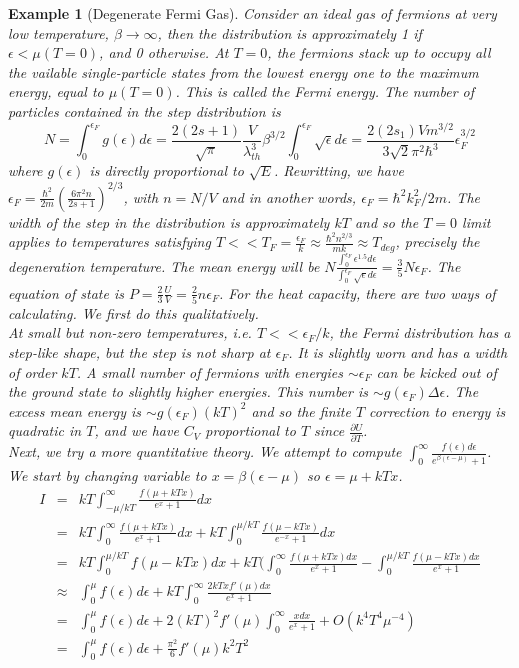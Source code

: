 \documentclass[a4paper]{article}
\newtheorem{eg}{Example}[section]
\theoremstyle{new}
\begin{document}
\begin{eg}[Degenerate Fermi Gas]
Consider an ideal gas of fermions at very low temperature, $\beta\rightarrow\infty$, then the distribution is approximately 1 if $\epsilon<\mu(T=0)$, and 0 otherwise. At $T=0$, the fermions stack up to occupy all the vailable single-particle states from the lowest energy one to the maximum energy, equal to $\mu(T=0)$. This is called the Fermi energy. The number of particles contained in the step distribution is
$$N=\int_0^{\epsilon_F}g(\epsilon)d\epsilon=\frac{2(2s+1)}{\sqrt{\pi}}\frac{V}{\lambda_{th}^3}\beta^{3/2}\int_0^{\epsilon_F}\sqrt{\epsilon}d\epsilon=\frac{2(2s_1)Vm^{3/2}}{3\sqrt{2}\pi^2\hbar^3}\epsilon_F^{3/2}$$
where $g(\epsilon)$ is directly proportional to $\sqrt{E}$. Rewritting, we have $\epsilon_F=\frac{\hbar^2}{2m}(\frac{6\pi^2n}{2s+1})^{2/3}$, with $n=N/V$ and in another words, $\epsilon_F=\hbar^2k_F^2/2m$. The width of the step in the distribution is approximately $kT$ and so the $T=0$ limit applies to temperatures satisfying $T<<T_F=\frac{\epsilon_F}{k}\approx \frac{\hbar^2n^{2/3}}{mk}\approx T_{deg}$, precisely the degeneration temperature. The mean energy will be $N\frac{\int_0^{\epsilon_F}\epsilon^{1.5}d\epsilon}{\int_0^{\epsilon_F}\sqrt{\epsilon}d\epsilon}=\frac{3}{5}N\epsilon_F$. The equation of state is $P=\frac{2}{3}\frac{U}{V}=\frac{2}{5}n\epsilon_F$. For the heat capacity, there are two ways of calculating. We first do this qualitatively.\\[5pt]
At small but non-zero temperatures, i.e. $T<<\epsilon_F/k$, the Fermi distribution has a step-like shape, but the step is not sharp at $\epsilon_F$. It is slightly worn and has a width of order $kT$. A small number of fermions with energies $\sim\epsilon_F$ can be kicked out of the ground state to slightly higher energies. This number is $\sim g(\epsilon_F)\Delta\epsilon$. The excess mean energy is $\sim g(\epsilon_F)(kT)^2$ and so the finite $T$ correction to energy is quadratic in $T$, and we have $C_V$ proportional to $T$ since $\frac{\partial U}{\partial T}$.\\[5pt]
Next, we try a more quantitative theory. We attempt to compute $\int_0^\infty\frac{f(\epsilon)d\epsilon}{e^{\beta(\epsilon-\mu)}+1}$. We start by changing variable to $x=\beta(\epsilon-\mu)$ so $\epsilon=\mu+kTx$.
\begin{eqnarray}
I&=&kT\int_{-\mu/kT}^\infty\frac{f(\mu+kTx)}{e^x+1}dx\nonumber\\&=&kT\int_0^\infty\frac{f(\mu+kTx)}{e^x+1}dx+kT\int_0^{\mu/kT}\frac{f(\mu-kTx)}{e^{-x}+1}dx\nonumber\\&=&kT\int_0^{\mu/kT}f(\mu-kTx)dx+kT\bigg(\int_0^\infty\frac{f(\mu+kTx)dx}{e^x+1}-\int_0^{\mu/kT}\frac{f(\mu-kTx)dx}{e^x+1}\nonumber\\&\approx&\int_0^\mu f(\epsilon)d\epsilon+kT\int_0^\infty\frac{2kTxf'(\mu)dx}{e^x+1}\nonumber\\&=&\int_0^\mu f(\epsilon)d\epsilon+2(kT)^2f'(\mu)\int_0^\infty\frac{xdx}{e^x+1}+O(k^4T^4\mu^{-4})\nonumber\\&=&\int_0^\mu f(\epsilon)d\epsilon+\frac{\pi^2}{6}f'(\mu)k^2T^2\nonumber

\end{eqnarray}
\end{eg}
\end{document}
